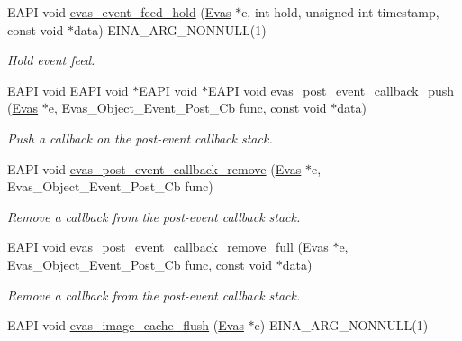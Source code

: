 \begin{DoxyCompactItemize}
EAPI void \hyperlink{group__Evas__Event__Feeding__Group_gaedc3a956cd753acdd2a58ad0d2865d04}{evas\_\-event\_\-feed\_\-hold} (\hyperlink{group__Evas__Canvas_ga5ff87cc4ce6bc43e3b640a6d37f73043}{Evas} $\ast$e, int hold, unsigned int timestamp, const void $\ast$data) EINA\_\-ARG\_\-NONNULL(1)
\begin{DoxyCompactList}\small\item\em Hold event feed. \item\end{DoxyCompactList}\item 
EAPI void EAPI void $\ast$EAPI void $\ast$EAPI void \hyperlink{group__Evas__Canvas__Events_ga8f8a2686dbbe3c55e091decf3f29d42a}{evas\_\-post\_\-event\_\-callback\_\-push} (\hyperlink{group__Evas__Canvas_ga5ff87cc4ce6bc43e3b640a6d37f73043}{Evas} $\ast$e, Evas\_\-Object\_\-Event\_\-Post\_\-Cb func, const void $\ast$data)
\begin{DoxyCompactList}\small\item\em Push a callback on the post-\/event callback stack. \item\end{DoxyCompactList}\item 
EAPI void \hyperlink{group__Evas__Canvas__Events_ga59f159113fe24fdb5e33e7df3e333516}{evas\_\-post\_\-event\_\-callback\_\-remove} (\hyperlink{group__Evas__Canvas_ga5ff87cc4ce6bc43e3b640a6d37f73043}{Evas} $\ast$e, Evas\_\-Object\_\-Event\_\-Post\_\-Cb func)
\begin{DoxyCompactList}\small\item\em Remove a callback from the post-\/event callback stack. \item\end{DoxyCompactList}\item 
EAPI void \hyperlink{group__Evas__Canvas__Events_ga3c76c419125c3cad9095f1fdae5f3ac9}{evas\_\-post\_\-event\_\-callback\_\-remove\_\-full} (\hyperlink{group__Evas__Canvas_ga5ff87cc4ce6bc43e3b640a6d37f73043}{Evas} $\ast$e, Evas\_\-Object\_\-Event\_\-Post\_\-Cb func, const void $\ast$data)
\begin{DoxyCompactList}\small\item\em Remove a callback from the post-\/event callback stack. \item\end{DoxyCompactList}\item 
EAPI void \hyperlink{group__Evas__Image__Group_gab236c9384f6fc7a3e1563839720a8214}{evas\_\-image\_\-cache\_\-flush} (\hyperlink{group__Evas__Canvas_ga5ff87cc4ce6bc43e3b640a6d37f73043}{Evas} $\ast$e) EINA\_\-ARG\_\-NONNULL(1)

\end{DoxyCompactItemize}
